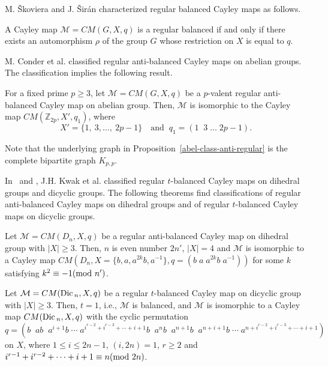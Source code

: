 \documentclass[12pt]{amsart}
\begin{document}
M. \v{S}koviera and J. \v{S}ir\'{a}n
characterized regular balanced Cayley maps as follows.

\begin{theorem}[\cite{SS1}] \label{bal-characterize}
A Cayley map $\mathcal{ M} =CM(G, X, q)$ is a
regular balanced if and only if there exists an
automorphism $\rho$ of the group $G$ whose restriction on $X$ is
equal to $q$.
\end{theorem}

M. Conder et al. classified regular anti-balanced
Cayley maps on abelian groups. The classification implies the
following result.

\begin{prop} \label{abel-class-anti-regular}
For a fixed prime $p \geq 3$, let $\mathcal{ M} =CM(G, X, q)$ be a
$p$-valent regular anti-balanced Cayley map on abelian group.
Then, $\mathcal{ M}$ is isomorphic to the Cayley map
$CM(\mathbb{Z}_{2p}, X', q_1)$, where
 $$X' = \{ 1,\ 3, \ldots, \
2p-1 \}\quad \mbox{and} \;\; q_1 = (1\;\;3\; \ldots
\;2p-1).$$
\end{prop}

Note that the underlying graph in
Proposition~\ref{abel-class-anti-regular} is the complete
bipartite graph $K_{p,p}$.

In~\cite{KKF} and \cite{KO}, J.H. Kwak et al. classified regular
$t$-balanced Cayley maps on dihedral groups and dicyclic groups.
 The following
theorems find  classifications of regular anti-balanced Cayley
maps on dihedral groups and of regular $t$-balanced Cayley maps on
dicyclic groups.

\begin{theorem} \label{class-anti-regular}
Let $\mathcal{ M} =CM(D_n, X,q)$ be a regular anti-balanced Cayley map
on dihedral group  with $|X| \geq 3$. Then, $n$ is even number
$2n'$, $|X|=4$ and $\mathcal{ M}$ is isomorphic to a Cayley map
$CM(D_n, X=\{b,a,a^{2k}b,a^{-1}\},q=(b\; a \; a^{2k}b \; a^{-1}))$
for some $k$ satisfying $k^{2} \equiv -1 ({\hbox{\rm mod }} n')$.
\end{theorem}

\begin{theorem}[\cite{KO}] \label{class-t-regular-dic}
Let $\mathcal{ M} =CM({\mbox{\rm Dic\,}}_n, X,q)$ be a regular $t$-balanced
Cayley map on dicyclic group  with $|X| \geq 3$. Then, $t=1$,
i.e., $\mathcal{ M}$  is balanced, and $\mathcal{ M}$ is
isomorphic to a Cayley map $CM({\mbox{\rm Dic\,}}_n, X,q)$ with the cyclic
permutation $$q=(b\;\; ab\;\; a^{i+1}b \;\cdots \;
a^{i^{r-2}+i^{r-3}+\cdots+i+1}b\;\; a^nb \;\; a^{n+1}b \;\;
a^{n+i+1}b\; \cdots \;a^{n+i^{r-2}+i^{r-3}+\cdots+i+1})$$ on $X$,
where $1 \leq i \leq 2n-1$, $(i,2n)=1$, $r \geq 2$ and
$i^{r-1}+i^{r-2}+\cdots+i+1 \equiv n ({\hbox{\rm mod }} 2n)$.
\end{theorem}
\end{document}
